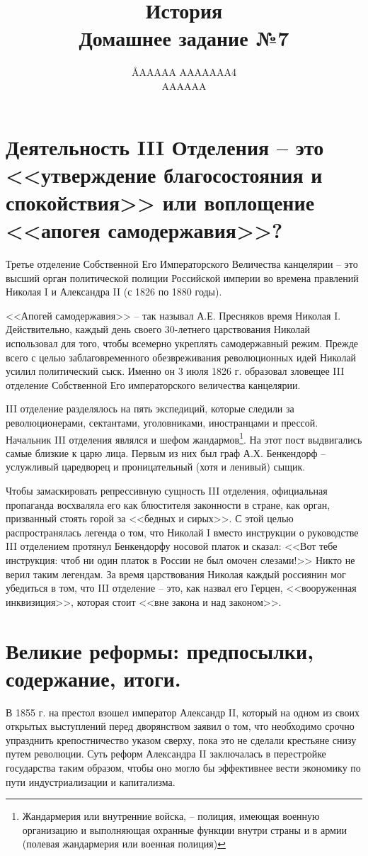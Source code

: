 \documentclass[12pt]{article}
\title{История \\ Домашнее задание №7}
\author{\AA{AAAAA AAAAAAA}{4} \\ AAAAAA}
\begin{document}
  \maketitle

  \section{Деятельность III Отделения -- это <<утверждение благосостояния и спокойствия>> или воплощение <<апогея самодержавия>>?}
  Третье отделение Собственной Его Императорского Величества канцелярии -- это высший орган политической полиции Российской империи во времена правлений Николая I и Александра II (с 1826 по 1880 годы).

  <<Апогей самодержавия>> -- так называл А.Е. Пресняков время Николая I.
  Действительно, каждый день своего 30-летнего царствования Николай использовал для того, чтобы всемерно укреплять самодержавный режим.
  Прежде всего с целью заблаговременного обезвреживания революционных идей Николай усилил политический сыск.
  Именно он 3 июля 1826 г. образовал зловещее III отделение Собственной Его императорского величества канцелярии.

  III отделение разделялось на пять экспедиций, которые следили за революционерами, сектантами, уголовниками, иностранцами и прессой.
  Начальник III отделения являлся и шефом жандармов\footnote{Жандармерия или внутренние войска, -- полиция, имеющая военную организацию и выполняющая охранные функции внутри страны и в армии (полевая жандармерия или военная полиция)}.
  На этот пост выдвигались самые близкие к царю лица.
  Первым из них был граф А.Х. Бенкендорф -- услужливый царедворец и проницательный (хотя и ленивый) сыщик.

  Чтобы замаскировать репрессивную сущность III отделения, официальная пропаганда восхваляла его как блюстителя законности в стране,
  как орган, призванный стоять горой за <<бедных и сирых>>.
  С этой целью распространялась легенда о том, что Николай I вместо инструкции о руководстве III отделением протянул Бенкендорфу носовой платок и сказал: <<Вот тебе инструкция: чтоб ни один платок в России не был омочен слезами!>>
  Никто не верил таким легендам.
  За время царствования Николая каждый россиянин мог убедиться в том, что III отделение -- это,
  как назвал его Герцен, <<вооруженная инквизиция>>, которая стоит <<вне закона и над законом>>.

  \setcounter{section}{3}
  \section{Великие реформы: предпосылки, содержание, итоги.}
  В 1855 г. на престол взошел император Александр II, который на одном из своих открытых выступлений перед дворянством заявил о том,
  что необходимо срочно упразднить крепостничество указом сверху, пока это не сделали крестьяне снизу путем революции.
  Суть реформ Александра II заключалась в перестройке государства таким образом,
  чтобы оно могло бы эффективнее вести экономику по пути индустриализации и капитализма.
\end{document}
